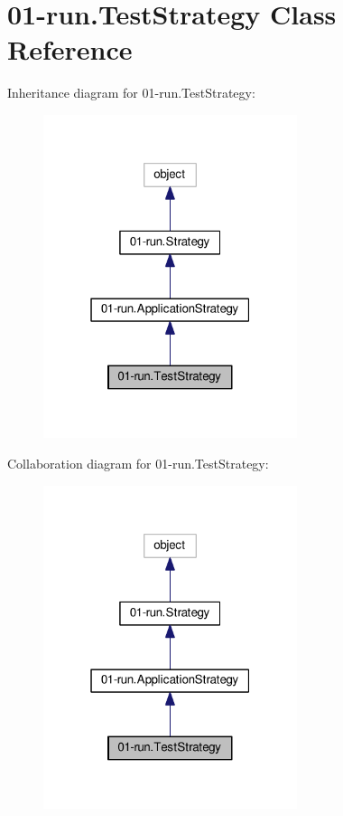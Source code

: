 \hypertarget{class01-run_1_1TestStrategy}{}\section{01-\/run.Test\+Strategy Class Reference}
\label{class01-run_1_1TestStrategy}


Inheritance diagram for 01-\/run.Test\+Strategy\+:
\nopagebreak
\begin{figure}[H]
\begin{center}
\leavevmode
\includegraphics[width=211pt]{class01-run_1_1TestStrategy__inherit__graph}
\end{center}
\end{figure}


Collaboration diagram for 01-\/run.Test\+Strategy\+:
\nopagebreak
\begin{figure}[H]
\begin{center}
\leavevmode
\includegraphics[width=211pt]{class01-run_1_1TestStrategy__coll__graph}
\end{center}
\end{figure}
